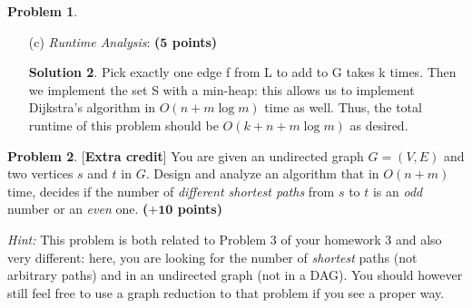 \documentclass{article}
\theoremstyle{definition}
\newtheorem{problem}{Problem}
\newtheorem*{solution*}{Solution}
\newenvironment{solution}{\begin{solution*}}{{} \end{solution*}}
\newcommand{\grade}[1]{\hfill{\textbf{($\mathbf{#1}$ points)}}}
\begin{document}
\begin{problem}
\begin{enumerate}
\begin{solution}
\end{solution}


\bigskip


	\item[(c)] \emph{Runtime Analysis}: \grade{5} 
	
	
\begin{solution}

	 Pick exactly one edge f from L to add to G takes k times. Then we implement the set S with a min-heap: this allows us to implement Dijkstra’s algorithm in $O(n+m\log{m})$ time as well. Thus, the total runtime of this problem should be $O(k+n+m\log{m})$ as desired. \\

\end{solution}

\end{enumerate}

\end{problem}

\newpage

\newpage

\begin{problem}\label{extra}[\textbf{Extra credit}]
	You are given an undirected graph $G=(V,E)$ and two vertices $s$ and $t$ in $G$. Design and analyze an algorithm that in $O(n+m)$ time, decides if the number of \emph{different shortest paths} from $s$ to $t$ is an \emph{odd} number or an \emph{even} one. 
	\grade{+10}
	
	\emph{Hint:} This problem is both related to Problem 3 of your homework 3 and also very different: here, you are looking for the number of \emph{shortest} paths (not arbitrary paths) and in an undirected graph (not in a DAG). You should however still feel free to use a graph reduction to that problem 
	if you see a proper way. 
	
\end{problem}
\end{document}
